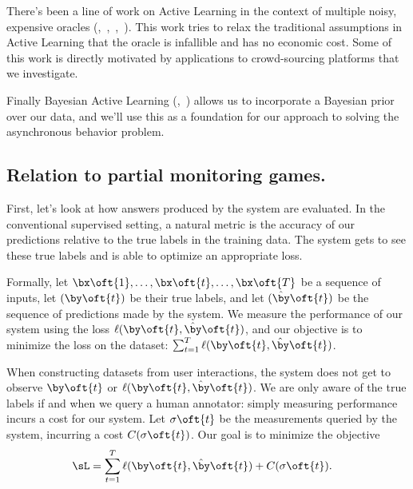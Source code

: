 There's been a line of work on Active Learning in the context of multiple noisy, expensive oracles (\cite{yan2011active},~\cite{donmez2008proactive},~\cite{golovin2010near},~\cite{vijayanarasimhan2014large}).
This work tries to relax the traditional assumptions in Active Learning that the oracle is infallible and has no economic cost.
Some of this work is directly motivated by applications to crowd-sourcing platforms that we investigate.


Finally Bayesian Active Learning (\cite{golovin2010near},~\cite{tong2000active}) allows us to incorporate a Bayesian prior over our data, and we'll use this as a foundation for our approach to solving the asynchronous behavior problem.

\subsection{Relation to partial monitoring games.}

First, let's look at how answers produced by the system are evaluated.
In the conventional supervised setting, a natural metric is the accuracy of our predictions relative to the true labels in the training data.
The system gets to see these true labels and is able to optimize an appropriate loss.

Formally, let $\bx\oft{1}, \dots, \bx\oft{t}, \dots, \bx\oft{T}$ be a sequence of inputs, 
let $(\by\oft{t})$ be their true labels,
and let $(\byt\oft{t})$ be the sequence of predictions made by the system.
We measure the performance of our system using the loss $\ell(\by\oft{t}, \byt\oft{t})$, and our objective is to minimize the loss on the dataset: $\sum_{t=1}^T \ell(\by\oft{t}, \byt\oft{t})$.

When constructing datasets from user interactions, the system does not get to observe $\by\oft{t}$ or $\ell(\by\oft{t}, \byt\oft{t})$.
We are only aware of the true labels if and when we query a human annotator: simply measuring performance incurs a cost for our system.
Let $\sigma\oft{t}$ be the measurements queried by the system, incurring a cost $C(\sigma\oft{t})$.
Our goal is to minimize the objective
\begin{align*}
  \sL &= \sum_{t=1}^T \ell(\by\oft{t}, \byt\oft{t}) + C(\sigma\oft{t}).
\end{align*}
